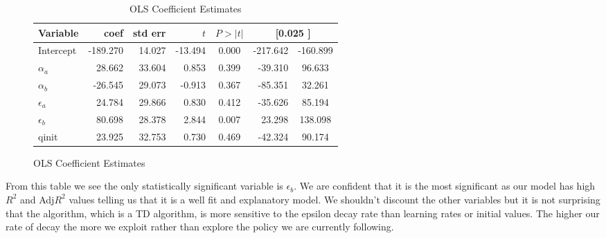 \documentclass{article}
\begin{document}
\begin{table}[htbp]
    \vspace{5mm} %
    
    \begin{subfigure}[b]{0.9\textwidth}
    
        \centering
        \caption{OLS Coefficient Estimates}
        \label{tab:ols_coefficients}
        \begin{tabular}{lrrrcrc}
            \toprule
            \textbf{Variable} & \textbf{coef} & \textbf{std err} & \textbf{$t$} & \textbf{$P>|t|$} & \multicolumn{2}{c}{\textbf{[0.025 \quad 0.975]}} \\ 
            \midrule
            Intercept & -189.270 & 14.027 & -13.494 & 0.000 & -217.642 & -160.899 \\
            $\alpha_a$ & 28.662 & 33.604 & 0.853 & 0.399 & -39.310 & 96.633 \\
            $\alpha_b$ & -26.545 & 29.073 & -0.913 & 0.367 & -85.351 & 32.261 \\
            $\epsilon_a$ & 24.784 & 29.866 & 0.830 & 0.412 & -35.626 & 85.194 \\
            $\epsilon_b$ & 80.698 & 28.378 & 2.844 & 0.007 & 23.298 & 138.098 \\
            qinit & 23.925 & 32.753 & 0.730 & 0.469 & -42.324 & 90.174 \\ 
            \bottomrule
        \end{tabular}
    \end{subfigure}

\end{table}
From this table we see the only statistically significant variable is $\epsilon_b$. We are confident that it is the most significant as our model has high $R^2$ and Adj$R^2$ values telling us that it is a well fit and explanatory model. We shouldn't discount the other variables but it is not surprising that the algorithm, which is a TD algorithm, is more sensitive to the epsilon decay rate than learning rates or initial values. The higher our rate of decay the more we exploit rather than explore the policy we are currently following.  
\end{document}
